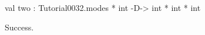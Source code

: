 \runverbatimtrue
{}
\begin{RunVerbatimMsg}
val two : Tutorial0032.modes * int -D-> int * int * int
\end{RunVerbatimMsg}
\begin{RunVerbatimErr}
Success.
\end{RunVerbatimErr}
